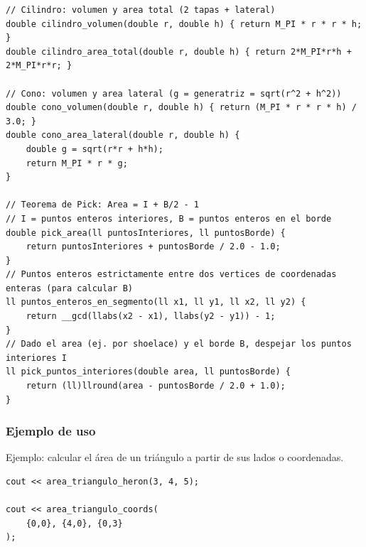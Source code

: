 \documentclass[10pt,twocolumn,letterpaper]{report}
\begin{document}
\begin{lstlisting}
// Cilindro: volumen y area total (2 tapas + lateral)
double cilindro_volumen(double r, double h) { return M_PI * r * r * h; }
double cilindro_area_total(double r, double h) { return 2*M_PI*r*h + 2*M_PI*r*r; }

// Cono: volumen y area lateral (g = generatriz = sqrt(r^2 + h^2))
double cono_volumen(double r, double h) { return (M_PI * r * r * h) / 3.0; }
double cono_area_lateral(double r, double h) {
    double g = sqrt(r*r + h*h);
    return M_PI * r * g;
}

// Teorema de Pick: Area = I + B/2 - 1
// I = puntos enteros interiores, B = puntos enteros en el borde
double pick_area(ll puntosInteriores, ll puntosBorde) {
    return puntosInteriores + puntosBorde / 2.0 - 1.0;
}
// Puntos enteros estrictamente entre dos vertices de coordenadas enteras (para calcular B)
ll puntos_enteros_en_segmento(ll x1, ll y1, ll x2, ll y2) {
    return __gcd(llabs(x2 - x1), llabs(y2 - y1)) - 1;
}
// Dado el area (ej. por shoelace) y el borde B, despejar los puntos interiores I
ll pick_puntos_interiores(double area, ll puntosBorde) {
    return (ll)llround(area - puntosBorde / 2.0 + 1.0);
}
\end{lstlisting}
\subsubsection*{Ejemplo de uso}
Ejemplo: calcular el área de un triángulo a partir de sus lados o coordenadas.
\begin{lstlisting}
cout << area_triangulo_heron(3, 4, 5);

cout << area_triangulo_coords(
    {0,0}, {4,0}, {0,3}
);
\end{lstlisting}


\end{document}
